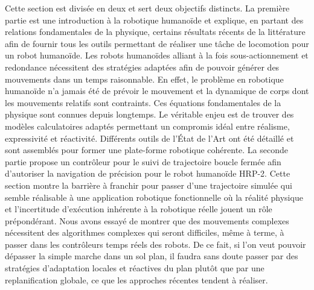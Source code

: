 Cette section est divisée en deux et sert deux objectifs distincts. La
première partie est une introduction à la robotique humanoïde et
explique, en partant des relations fondamentales de la physique,
certains résultats récents de la littérature afin de fournir tous les
outils permettant de réaliser une tâche de locomotion pour un robot
humanoïde. Les robots humanoïdes alliant à la fois sous-actionnement
et redondance nécessitent des stratégies adaptées afin de pouvoir
générer des mouvements dans un temps raisonnable. En effet, le
problème en robotique humanoïde n'a jamais été de prévoir le mouvement
et la dynamique de corps dont les mouvements relatifs sont
contraints. Ces équations fondamentales de la physique sont connues
depuis longtemps. Le véritable enjeu est de trouver des modèles
calculatoires adaptés permettant un compromis idéal entre réalisme,
expressivité et réactivité. Différents outils de l'État de l'Art ont
été détaillé et sont assemblés pour former une plate-forme robotique
cohérente. La seconde partie propose un contrôleur pour le suivi de
trajectoire boucle fermée afin d'autoriser la navigation de précision
pour le robot humanoïde HRP-2. Cette section montre la barrière à
franchir pour passer d'une trajectoire simulée qui semble réalisable à
une application robotique fonctionnelle où la réalité physique et
l'incertitude d'exécution inhérente à la robotique réelle jouent un
rôle prépondérant. Nous avons essayé de montrer que des mouvements
complexes nécessitent des algorithmes complexes qui seront difficiles,
même à terme, à passer dans les contrôleurs temps réels des robots. De
ce fait, si l'on veut pouvoir dépasser la simple marche dans un sol
plan, il faudra sans doute passer par des stratégies d'adaptation
locales et réactives du plan plutôt que par une replanification
globale, ce que les approches récentes tendent à réaliser.
